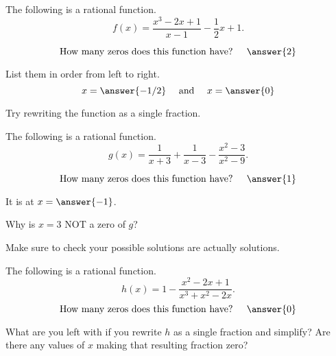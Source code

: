 \documentclass{ximera}
\author{Carl Stitz \and Jeff Zeager \and  Bobby Ramsey}
\begin{document}
\licenseSZ
\begin{exercise}
	The following is a rational function.
	$$f(x) = \frac{x^3-2x+1}{x-1} - \frac{1}{2} x + 1.$$
	
	$$ \text{How many zeros does this function have? } \quad \answer{2} $$
	\begin{exercise}
		List them in order from left to right.
		\[ x = \answer{-1/2}  \quad \text{ and } \quad x=\answer{0} \]
	\end{exercise}
\end{exercise}
\begin{hint}
	Try rewriting the function as a single fraction.
\end{hint}

\begin{exercise}
	The following is a rational function.
	$$ g(x) = \frac{1}{x+3} + \frac{1}{x-3} - \frac{x^2-3}{x^2-9}. $$
	
	$$ \text{How many zeros does this function have? } \quad \answer{1} $$
	\begin{exercise}
		It is at $x = \answer{-1}$.
		\begin{exercise}
			Why is $x=3$ NOT a zero of $g$?
			\begin{multipleChoice}
			\end{multipleChoice}
		\end{exercise}
	\end{exercise}
\end{exercise}
\begin{hint}
	Make sure to check your possible solutions are actually solutions.
\end{hint}

\begin{exercise}
	The following is a rational function.
	$$ h(x) = 1 - \frac{x^2-2x+1}{x^3+x^2-2x}. $$
	$$ \text{How many zeros does this function have? } \quad \answer{0} $$
	\begin{feedback}
		What are you left with if you rewrite $h$ as a single fraction and simplify? Are there any values of $x$ making that resulting fraction zero?	
	\end{feedback}		
\end{exercise}
\end{document}
